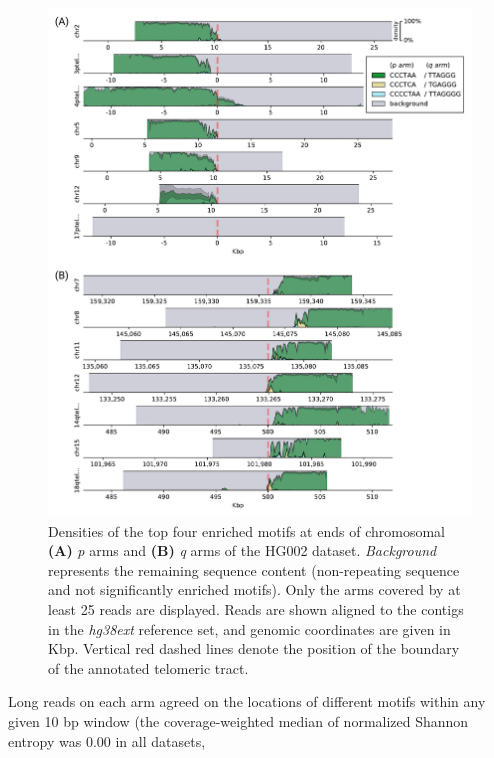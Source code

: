 \documentclass{article}
\begin{document}
        \begin{figure}[h!] \centering
        \includegraphics[height=.88\textheight,width=\textwidth,keepaspectratio]{../figures/Figure_2.pdf}
        \caption{
             \small Densities of the top four enriched motifs at ends of chromosomal \textbf{(A)} \textit{p} arms
             and \textbf{(B)} \textit{q} arms of the HG002 dataset.
             \textit{Background} represents the remaining sequence content (non-repeating sequence and not significantly enriched motifs).
             Only the arms covered by at least 25 reads are displayed.
             Reads are shown aligned to the contigs in the \textit{hg38ext} reference set, and genomic coordinates are given in Kbp.
             Vertical red dashed lines denote the position of the boundary of the annotated telomeric tract.
        }
        \label{fig:hg002_densityplot}
        \end{figure}
    \noindent %
    Long reads on each arm agreed on the locations of different motifs within any given 10 bp window
        (the coverage-weighted median of normalized Shannon entropy was 0.00 in all datasets,
\end{document}
